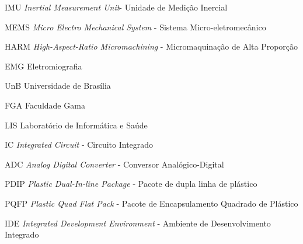 \begin{siglas}
   \item[IMU] \textit{Inertial Measurement Unit}- Unidade de Medição Inercial
   \item[MEMS]  \textit{Micro Electro Mechanical System} - Sistema Micro-eletromecânico
   \item[HARM] \textit{High-Aspect-Ratio Micromachining} - Micromaquinação de Alta Proporção 
   \item[EMG] Eletromiografia
   \item[UnB] Universidade de Brasília
   \item[FGA] Faculdade Gama
   \item[LIS] Laboratório de Informática e Saúde
   \item[IC] \textit{Integrated Circuit} - Circuito Integrado
   \item[ADC] \textit{Analog Digital Converter} - Conversor Analógico-Digital
   \item[PDIP] \textit{Plastic Dual-In-line Package} - Pacote de dupla linha de plástico
   \item[PQFP] \textit{Plastic Quad Flat Pack} - Pacote de Encapsulamento Quadrado de Plástico
   \item[IDE] \textit{Integrated Development Environment} - Ambiente de Desenvolvimento Integrado
\end{siglas}
